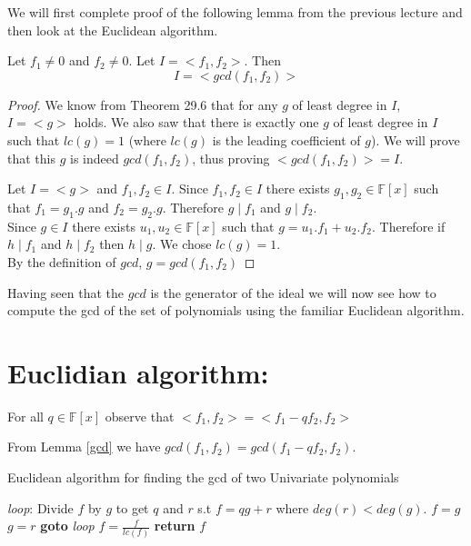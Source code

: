 We will first complete proof of the following lemma from the previous lecture and then look at the Euclidean algorithm.

\begin{lemma}
\label{gcd}
Let $f_1 \neq 0$ and $f_2\neq 0$. Let $I = <f_1, f_2>$. Then
$$I=<gcd(f_1,f_2)>$$
\end{lemma}
\begin{proof}
We know from Theorem 29.6 that for any $g$ of least degree in $I$, $I=<g>$ holds. We also saw that there is exactly one $g$ of least degree in $I$ such that $lc(g)=1$ (where $lc(g)$ is the leading coefficient of $g$). We will prove that this $g$ is indeed $gcd(f_{1},f_{2})$, thus proving $<gcd(f_{1},f_{2})>=I$.

Let $I=<g>$ and $f_{1},f_{2}\in I$. Since $f_{1},f_{2}\in I$ there exists $g_{1},g_{2}\in \mathbb{F}[x]$ such that $f_{1}=g_{1}.g$ and $f_{2}=g_{2}.g$. Therefore $g\mid f_{1}$ and $g\mid f_{2}$. \\

Since $g\in I$ there exists $u_{1},u_{2}\in \mathbb{F}[x]$ such that $g=u_{1}.f_{1}+u_{2}.f_{2}$. Therefore if $h\mid f_{1}$ and 
$h\mid f_{2}$ then $h\mid g$. We chose $lc(g)=1$.\\
By the definition of $gcd$, $g=gcd(f_{1},f_{2})$
\end{proof}

Having seen that the $gcd$ is the generator of the ideal we will now see how to compute the gcd of the set of polynomials using the familiar Euclidean algorithm.


\section*{Euclidian algorithm:}
\begin{observation}
For all $q\in \mathbb{F}[x]$ observe that
$<f_{1},f_{2}>=<f_{1}-qf_{2},f_{2}>$
\end{observation}

From Lemma \ref{gcd} we have $gcd(f_{1},f_{2})=gcd(f_{1}-qf_{2},f_{2})$.


\begin{algorithm}
\caption{Euclidean algorithm for finding the gcd of two Univariate polynomials}
\label{alg:euclid}
\begin{algorithmic}[1]
\State \emph{loop}:
\State Divide $f$ by $g$ to get $q$ and $r$ s.t $f=qg+r$ where $deg(r)< deg(g)$.
\State $f=g$
\State $g=r$
\State \textbf{goto} \emph{loop}
\EndIf
\State $f=\frac{f}{lc(f)}$
\State \textbf{return} $f$
\EndProcedure
\end{algorithmic}
\end{algorithm}



